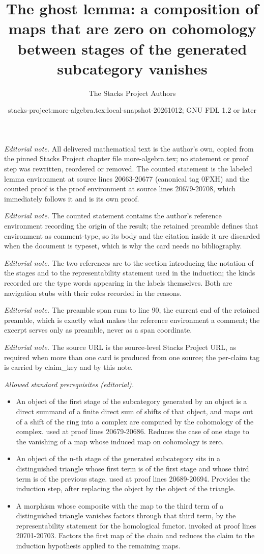 \documentclass[10pt,a4paper]{amsart}
\title{The ghost lemma: a composition of maps that are zero on cohomology between stages of the generated subcategory vanishes}
\author{The Stacks Project Authors}
\date{stacks-project:more-algebra.tex:local-snapshot-20261012; GNU FDL 1.2 or later}
\theoremstyle{plain}
\theoremstyle{definition}
\theoremstyle{remark}
\numberwithin{equation}{subsection}
\begin{document}
\maketitle
\setcounter{subsection}{1}
\noindent\textit{Editorial note.} All delivered mathematical text is the author's own, copied from the pinned Stacks Project chapter file more-algebra.tex; no statement or proof step was rewritten, reordered or removed. The counted statement is the labeled lemma environment at source lines 20663-20677 (canonical tag 0FXH) and the counted proof is the proof environment at source lines 20679-20708, which immediately follows it and is its own proof.\par\medskip
\noindent\textit{Editorial note.} The counted statement contains the author's reference environment recording the origin of the result; the retained preamble defines that environment as comment-type, so its body and the citation inside it are discarded when the document is typeset, which is why the card needs no bibliography.\par\medskip
\noindent\textit{Editorial note.} The two references are to the section introducing the notation of the stages and to the representability statement used in the induction; the kinds recorded are the type words appearing in the labels themselves. Both are navigation stubs with their roles recorded in the reasons.\par\medskip
\noindent\textit{Editorial note.} The preamble span runs to line 90, the current end of the retained preamble, which is exactly what makes the reference environment a comment; the excerpt serves only as preamble, never as a span coordinate.\par\medskip
\noindent\textit{Editorial note.} The source URL is the source-level Stacks Project URL, as required when more than one card is produced from one source; the per-claim tag is carried by claim\_key and by this note.\par\medskip
\noindent\textit{Allowed standard prerequisites (editorial).}\begin{itemize}
\item An object of the first stage of the subcategory generated by an object is a direct summand of a finite direct sum of shifts of that object, and maps out of a shift of the ring into a complex are computed by the cohomology of the complex. used at proof lines 20679-20686. Reduces the case of one stage to the vanishing of a map whose induced map on cohomology is zero.
\item An object of the n-th stage of the generated subcategory sits in a distinguished triangle whose first term is of the first stage and whose third term is of the previous stage. used at proof lines 20689-20694. Provides the induction step, after replacing the object by the object of the triangle.
\item A morphism whose composite with the map to the third term of a distinguished triangle vanishes factors through that third term, by the representability statement for the homological functor. invoked at proof lines 20701-20703. Factors the first map of the chain and reduces the claim to the induction hypothesis applied to the remaining maps.
\end{itemize}\medskip
\end{document}
